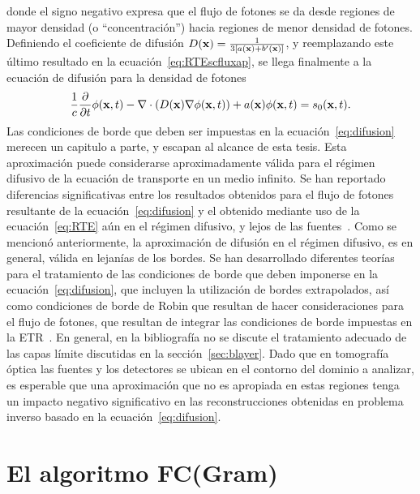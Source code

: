 donde el signo negativo expresa que el flujo de fotones se da desde regiones 
de mayor densidad (o ``concentración'') hacia regiones de menor densidad de fotones. 
Definiendo el coeficiente de difusión $D(\mathbf{x})=\frac{1}{3[a(\mathbf{x})+b'(\mathbf{x})]}$, y reemplazando 
este último resultado en la ecuación~\eqref{eq:RTEscfluxap}, se 
llega finalmente a la ecuación de difusión para la densidad de fotones
\begin{equation}
\frac{1}{c}\frac{\partial}{\partial t} \phi(\mathbf{x},t)-\nabla \cdot \left( D(\mathbf{x}) \nabla  \phi(\mathbf{x},t) \right)
+a(\mathbf{x})\phi(\mathbf{x},t)=s_0(\mathbf{x},t).
\label{eq:difusion}
\end{equation}
Las condiciones de borde que deben ser impuestas en la ecuación~\eqref{eq:difusion} 
merecen un capitulo a parte, y escapan al alcance de esta tesis. 
Esta aproximación puede considerarse aproximadamente válida para el régimen difusivo de la ecuación 
de transporte en un medio infinito. Se han 
reportado diferencias significativas entre los resultados obtenidos para el 
flujo de fotones resultante de la ecuación~\eqref{eq:difusion} y el obtenido 
mediante uso de la ecuación~\eqref{eq:RTE} aún 
en el régimen difusivo, y lejos de las fuentes~\cite{Hielscher1998}. Como se mencionó anteriormente, 
la aproximación de difusión en el régimen difusivo, es en general, válida en lejanías 
de los bordes. Se han desarrollado diferentes teorías para el tratamiento de las 
condiciones de borde que deben imponerse en la ecuación~\eqref{eq:difusion}, 
que incluyen la utilización de bordes extrapolados, así como condiciones de borde de Robin que resultan de hacer consideraciones para el flujo de fotones, que resultan de integrar las condiciones de borde impuestas en la ETR~\cite{Arridge2009,Haskell1994,Ishimaru1978,Arridge1999,Xu2002}. En general, en la bibliografía 
no se discute el tratamiento adecuado de las capas límite discutidas en la sección~\ref{sec:blayer}. Dado que en tomografía óptica las fuentes y los detectores 
se ubican en el contorno del dominio a analizar, es esperable que una aproximación 
que no es apropiada en estas regiones tenga un impacto negativo significativo en las reconstrucciones obtenidas en problema inverso basado en la ecuación~\eqref{eq:difusion}. 
\pagebreak

\section{El algoritmo FC(Gram)}
\label{ap:ecdiff}

